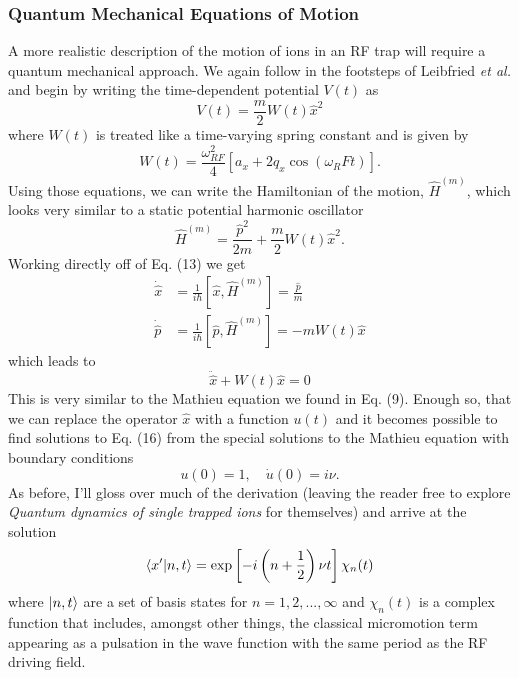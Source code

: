 \subsubsection{Quantum Mechanical Equations of Motion}
A more realistic description of the motion of ions in an RF trap will require a quantum mechanical approach. We again follow in the footsteps of Leibfried \textit{et al.} and begin by writing the time-dependent potential $V(t)$ as
\begin{equation}
    V(t) = \frac{m}{2} W(t) \hat{x}^2
\end{equation}
where $W(t)$ is treated like a time-varying spring constant and is given by
\begin{equation}
    W(t) = \frac{\omega_{RF}^2}{4} [a_x + 2q_x \cos(\omega_RF t)].
\end{equation}
Using those equations, we can write the Hamiltonian of the motion, $\hat{H}^{(m)}$, which looks very similar to a static potential harmonic oscillator
\begin{equation}
    \hat{H}^{(m)} = \frac{\hat{p}^2}{2m} + \frac{m}{2} W(t) \hat{x}^2.
\end{equation}
Working directly off of Eq. (13) we get
\begin{align}
    \dot{\hat{x}} &= \frac{1}{i\hbar} [\hat{x}, \hat{H}^{(m)}] = \frac{\hat{p}}{m}\\
    \dot{\hat{p}} &= \frac{1}{i\hbar} [\hat{p}, \hat{H}^{(m)}] = -m W(t) \hat{x}
\end{align}
which leads to
\begin{equation}
    \ddot{\hat{x}} + W(t) \hat{x} = 0
\end{equation}
This is very similar to the Mathieu equation we found in Eq. (9). Enough so, that we can replace the operator $\hat{x}$ with a function $u(t)$ and it becomes possible to find solutions to Eq. (16) from the special solutions to the Mathieu equation with boundary conditions
\begin{equation}
    u(0) = 1, \quad \dot{u}(0) = i\nu.
\end{equation}
As before, I'll gloss over much of the derivation (leaving the reader free to explore \textit{Quantum dynamics of single trapped ions} for themselves) \cite{Leibfried} and arrive at the solution
\begin{equation}
    \braket{x'}{n, t} = \exp \left[ -i \left(n + \frac{1}{2} \right) \nu t \right] \chi_n (t)    
\end{equation}
where $\ket{n, t}$ are a set of basis states for $n = 1, 2, ..., \infty$ and $\chi_n(t)$ is a complex function that includes, amongst other things, the classical micromotion term appearing as a pulsation in the wave function with the same period as the RF driving field.
